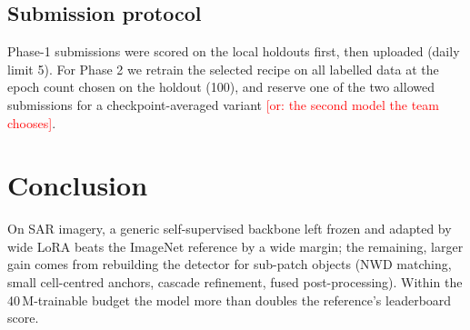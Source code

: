 \documentclass[10pt,twocolumn,letterpaper]{article}
\newcommand{\todo}[1]{\textcolor{red}{[#1]}}
\begin{document}
\subsection{Submission protocol}
Phase-1 submissions were scored on the local holdouts first, then uploaded
(daily limit 5). For Phase 2 we retrain the selected recipe on all labelled
data at the epoch count chosen on the holdout (100), and reserve one of the
two allowed submissions for a checkpoint-averaged variant \todo{or: the
second model the team chooses}.

\section{Conclusion}
On SAR imagery, a generic self-supervised backbone left frozen and adapted by
wide LoRA beats the ImageNet reference by a wide margin; the remaining, larger
gain comes from rebuilding the detector for sub-patch objects (NWD matching,
small cell-centred anchors, cascade refinement, fused post-processing). Within
the 40\,M-trainable budget the model more than doubles the reference's
leaderboard score.

{\small


}
\end{document}
